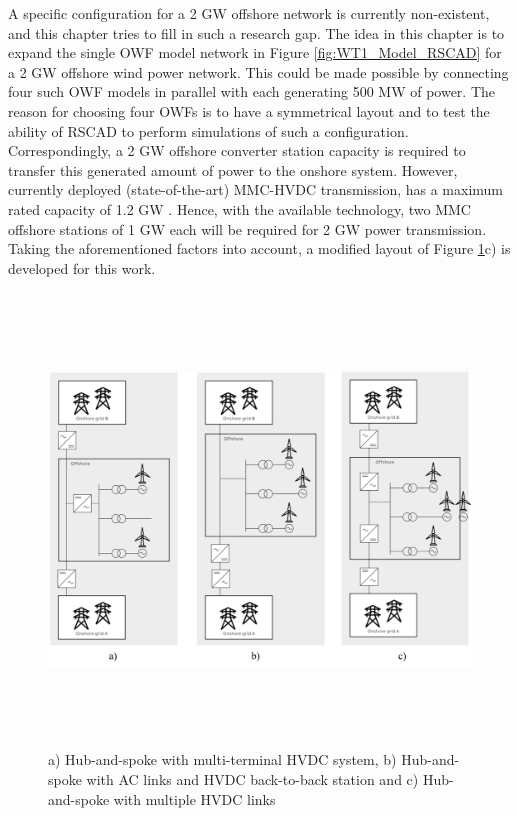 A specific configuration for a 2 GW offshore network is currently non-existent, and this chapter tries to fill in such a research gap. The idea in this chapter is to expand the single \gls{OWF} model network in Figure \ref{fig:WT1_Model_RSCAD} for a 2 GW offshore wind power network. This could be made possible by connecting four such \gls{OWF} models in parallel with each generating 500 MW of power. The reason for choosing four \gls{OWF}s is to have a symmetrical layout and to test the ability of RSCAD to perform simulations of such a configuration. Correspondingly, a 2 GW offshore converter station capacity is required to transfer this generated amount of power to the onshore system. However, currently deployed (state-of-the-art) \gls{MMC}-\gls{HVDC} transmission, has a maximum rated capacity of 1.2 GW \cite{peralta2012detailed}. Hence, with the available technology, two \gls{MMC} offshore stations of 1 GW each will be required for 2 GW power transmission. Taking the aforementioned factors into account, a modified layout of Figure \ref{fig:ABB_Hub_Spoke_3}c) is developed for this work. 

\begin{figure}[H]
\centering
    \includegraphics[height = 12cm,width = \textwidth]{Diagrams/Chapter_4/ABB_Hub_Spoke_3.png}
    \caption{a) Hub-and-spoke with multi-terminal HVDC system, b) Hub-and-spoke with AC links and HVDC back-to-back station and c) Hub-and-spoke with multiple HVDC links \cite{abb_hvdc_2018}}
    \label{fig:ABB_Hub_Spoke_3}
\end{figure}


